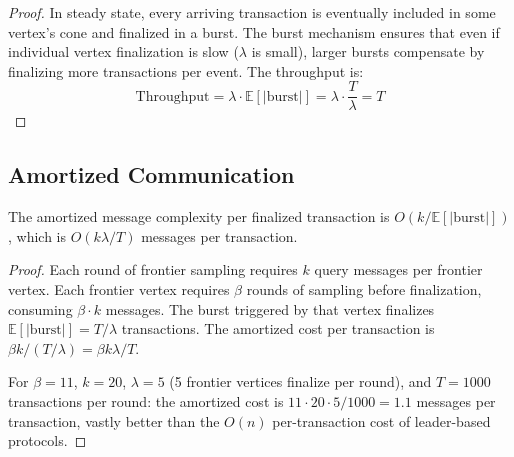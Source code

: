\begin{proof}
In steady state, every arriving transaction is eventually included in some vertex's
cone and finalized in a burst. The burst mechanism ensures that even if individual
vertex finalization is slow ($\lambda$ is small), larger bursts compensate by
finalizing more transactions per event. The throughput is:
\[
\text{Throughput} = \lambda \cdot \mathbb{E}[|\text{burst}|] = \lambda \cdot \frac{T}{\lambda} = T
\]
\end{proof}

\subsection{Amortized Communication}

\begin{lemma}
\label{lem:communication}
The amortized message complexity per finalized transaction is $O(k / \mathbb{E}[|\text{burst}|])$,
which is $O(k\lambda/T)$ messages per transaction.
\end{lemma}

\begin{proof}
Each round of frontier sampling requires $k$ query messages per frontier vertex.
Each frontier vertex requires $\beta$ rounds of sampling before finalization,
consuming $\beta \cdot k$ messages. The burst triggered by that vertex finalizes
$\mathbb{E}[|\text{burst}|] = T/\lambda$ transactions. The amortized cost per
transaction is $\beta k / (T/\lambda) = \beta k \lambda / T$.

For $\beta = 11$, $k = 20$, $\lambda = 5$ (5 frontier vertices finalize per round),
and $T = 1000$ transactions per round: the amortized cost is
$11 \cdot 20 \cdot 5 / 1000 = 1.1$ messages per transaction, vastly better than
the $O(n)$ per-transaction cost of leader-based protocols.
\end{proof}

